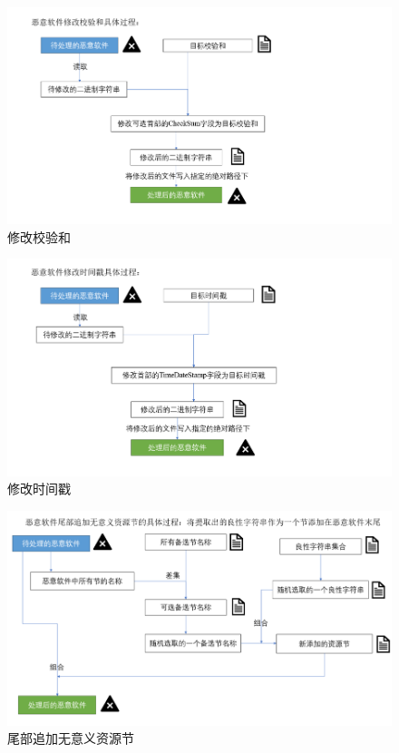 \begin{figure}
  \centering
  \includegraphics[]{images/modify_checksum.png}
  \caption{修改校验和}\label{fig:modify_checksum}
\end{figure}

\begin{figure}
  \centering
  \includegraphics[]{images/modify_timestamp.png}
  \caption{修改时间戳}\label{fig:modify_timestamp}
\end{figure}

\begin{figure}
  \centering
  \includegraphics[]{images/append_benign_sections.png}
  \caption{尾部追加无意义资源节}\label{fig:append_benign_sections}
\end{figure}

